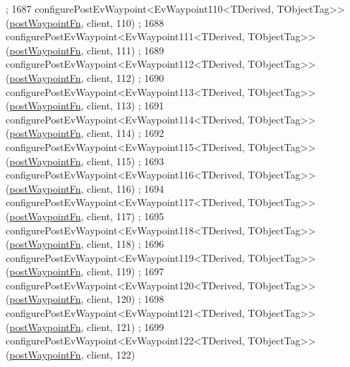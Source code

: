 \begin{DoxyCode}
      ;
1687     configurePostEvWaypoint<EvWaypoint110<TDerived, TObjectTag>>(\hyperlink{classmove__base__z__client_1_1WaypointEventDispatcher_acc538eb7506c13f7cca2268a1742dadd}{postWaypointFn}, client, 110)
      ;
1688     configurePostEvWaypoint<EvWaypoint111<TDerived, TObjectTag>>(\hyperlink{classmove__base__z__client_1_1WaypointEventDispatcher_acc538eb7506c13f7cca2268a1742dadd}{postWaypointFn}, client, 111)
      ;
1689     configurePostEvWaypoint<EvWaypoint112<TDerived, TObjectTag>>(\hyperlink{classmove__base__z__client_1_1WaypointEventDispatcher_acc538eb7506c13f7cca2268a1742dadd}{postWaypointFn}, client, 112)
      ;
1690     configurePostEvWaypoint<EvWaypoint113<TDerived, TObjectTag>>(\hyperlink{classmove__base__z__client_1_1WaypointEventDispatcher_acc538eb7506c13f7cca2268a1742dadd}{postWaypointFn}, client, 113)
      ;
1691     configurePostEvWaypoint<EvWaypoint114<TDerived, TObjectTag>>(\hyperlink{classmove__base__z__client_1_1WaypointEventDispatcher_acc538eb7506c13f7cca2268a1742dadd}{postWaypointFn}, client, 114)
      ;
1692     configurePostEvWaypoint<EvWaypoint115<TDerived, TObjectTag>>(\hyperlink{classmove__base__z__client_1_1WaypointEventDispatcher_acc538eb7506c13f7cca2268a1742dadd}{postWaypointFn}, client, 115)
      ;
1693     configurePostEvWaypoint<EvWaypoint116<TDerived, TObjectTag>>(\hyperlink{classmove__base__z__client_1_1WaypointEventDispatcher_acc538eb7506c13f7cca2268a1742dadd}{postWaypointFn}, client, 116)
      ;
1694     configurePostEvWaypoint<EvWaypoint117<TDerived, TObjectTag>>(\hyperlink{classmove__base__z__client_1_1WaypointEventDispatcher_acc538eb7506c13f7cca2268a1742dadd}{postWaypointFn}, client, 117)
      ;
1695     configurePostEvWaypoint<EvWaypoint118<TDerived, TObjectTag>>(\hyperlink{classmove__base__z__client_1_1WaypointEventDispatcher_acc538eb7506c13f7cca2268a1742dadd}{postWaypointFn}, client, 118)
      ;
1696     configurePostEvWaypoint<EvWaypoint119<TDerived, TObjectTag>>(\hyperlink{classmove__base__z__client_1_1WaypointEventDispatcher_acc538eb7506c13f7cca2268a1742dadd}{postWaypointFn}, client, 119)
      ;
1697     configurePostEvWaypoint<EvWaypoint120<TDerived, TObjectTag>>(\hyperlink{classmove__base__z__client_1_1WaypointEventDispatcher_acc538eb7506c13f7cca2268a1742dadd}{postWaypointFn}, client, 120)
      ;
1698     configurePostEvWaypoint<EvWaypoint121<TDerived, TObjectTag>>(\hyperlink{classmove__base__z__client_1_1WaypointEventDispatcher_acc538eb7506c13f7cca2268a1742dadd}{postWaypointFn}, client, 121)
      ;
1699     configurePostEvWaypoint<EvWaypoint122<TDerived, TObjectTag>>(\hyperlink{classmove__base__z__client_1_1WaypointEventDispatcher_acc538eb7506c13f7cca2268a1742dadd}{postWaypointFn}, client, 122)

\end{DoxyCode}
